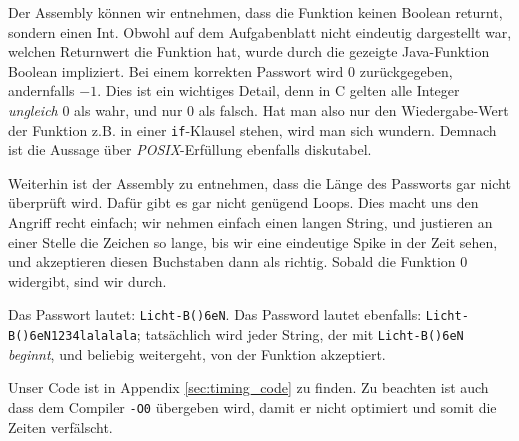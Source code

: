 \documentclass[a4paper,12bpt]{scrartcl}
\begin{document}
\medskip

Der Assembly können wir entnehmen, dass die Funktion keinen Boolean returnt, sondern einen Int. Obwohl auf dem
Aufgabenblatt nicht eindeutig dargestellt war, welchen Returnwert die Funktion hat, wurde durch die gezeigte
Java-Funktion Boolean impliziert. Bei einem korrekten Passwort wird $0$ zurückgegeben, andernfalls $-1$.
Dies ist ein wichtiges Detail, denn in C gelten alle Integer \textit{ungleich} $0$ als wahr, und nur $0$ als falsch.
Hat man also nur den Wiedergabe-Wert der Funktion z.B. in einer \texttt{if}-Klausel stehen, wird man sich wundern.
Demnach ist die Aussage über \textit{POSIX}-Erfüllung ebenfalls diskutabel.

\medskip

Weiterhin ist der Assembly zu entnehmen, dass die Länge des Passworts gar nicht überprüft wird. Dafür gibt es gar nicht genügend
Loops. Dies macht uns den Angriff recht einfach; wir nehmen einfach einen langen String, und justieren an einer Stelle
die Zeichen so lange, bis wir eine eindeutige Spike in der Zeit sehen, und akzeptieren diesen Buchstaben dann als richtig.
Sobald die Funktion $0$ widergibt, sind wir durch.

\medskip

Das Passwort lautet: \texttt{Licht-B()6eN}. Das Password lautet ebenfalls: \texttt{Licht-B()6eN1234lalalala};
tatsächlich wird jeder String, der mit \texttt{Licht-B()6eN} \textit{beginnt}, und beliebig weitergeht, von der Funktion akzeptiert.

\medskip

Unser Code ist in Appendix \ref{sec:timing_code} zu finden. Zu beachten ist auch dass dem Compiler \texttt{-O0} übergeben wird,
damit er nicht optimiert und somit die Zeiten verfälscht.
\end{document}
